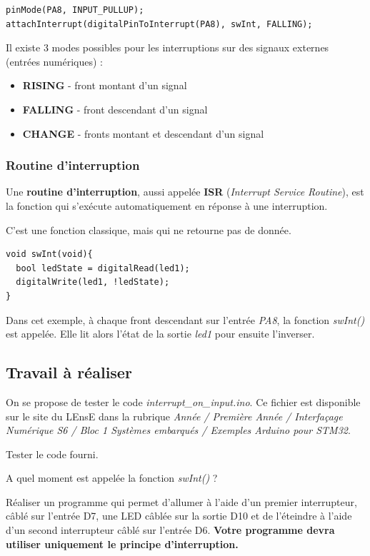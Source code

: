 \documentclass[a4paper,11pt,titlepage]{article} %
\begin{document}
\begin{lstlisting}
pinMode(PA8, INPUT_PULLUP);
attachInterrupt(digitalPinToInterrupt(PA8), swInt, FALLING); 
\end{lstlisting}

Il existe 3 modes possibles pour les interruptions sur des signaux externes (entrées numériques) : 

\begin{itemize}
	\item \textbf{RISING} - front montant d'un signal
	\item \textbf{FALLING} - front descendant d'un signal
	\item \textbf{CHANGE} - fronts montant et descendant d'un signal
\end{itemize}


\subsubsection{Routine d'interruption}

Une \textbf{routine d'interruption}, aussi appelée \textbf{ISR} (\textit{Interrupt Service Routine}), est la fonction qui s'exécute automatiquement en réponse à une interruption. 

C'est une fonction classique, mais qui ne retourne pas de donnée.

\begin{lstlisting}
void swInt(void){
  bool ledState = digitalRead(led1);
  digitalWrite(led1, !ledState);
} 
\end{lstlisting}

Dans cet exemple, à chaque front descendant sur l'entrée \textsl{PA8}, la fonction \textsl{swInt()} est appelée. Elle lit alors l'état de la sortie \textsl{led1} pour ensuite l'inverser.

\subsection{Travail à réaliser}

On se propose de tester le code \textsl{interrupt\_on\_input.ino}. Ce fichier est disponible sur le site du LEnsE dans la rubrique \textit{Année / Première Année / Interfaçage Numérique S6 / Bloc 1 Systèmes embarqués / Exemples Arduino pour STM32}.

\Manip Tester le code fourni. 

\Quest A quel moment est appelée la fonction \textsl{swInt()} ?

\Manip Réaliser un programme qui permet d'allumer à l'aide d'un premier interrupteur, câblé sur l'entrée D7, une LED câblée sur la sortie D10 et de l'éteindre à l'aide d'un second interrupteur câblé sur l'entrée D6. \textbf{Votre programme devra utiliser uniquement le principe d'interruption.}
\end{document}
